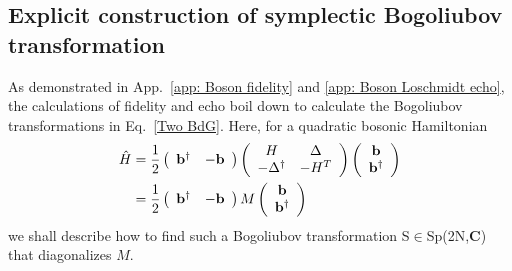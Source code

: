 \subsection{Explicit construction of symplectic Bogoliubov transformation}
\label{app: Explicit construction of symplectic Bogoliubov transformation}
As demonstrated in App.~\ref{app: Boson fidelity} and \ref{app: Boson Loschmidt echo}, the calculations of fidelity and echo boil down to calculate the Bogoliubov transformations in Eq.~\eqref{Two BdG}. Here, for a quadratic bosonic Hamiltonian
\begin{eqnarray}\begin{aligned}
\label{Quadratic boson H2}
\hat{H}&=\frac{1}{2}
\left(\begin{array}{ccc}
{\bf b}^\dagger & -{\bf b}
\end{array}\right)
\left(\begin{array}{ccc}
H & \Delta\\
-\Delta^\dagger & -H^T
\end{array}\right)
\left(\begin{array}{ccc}
{\bf b} \\
{\bf b}^\dagger
\end{array}\right)\\
&=\frac{1}{2}
\left(\begin{array}{ccc}
{\bf b}^\dagger & -{\bf b}
\end{array}\right)
M
\left(\begin{array}{ccc}
{\bf b} \\
{\bf b}^\dagger
\end{array}\right)
\end{aligned}\end{eqnarray}
we shall describe how to find such a Bogoliubov transformation S$\in$Sp(2N,{\bf C}) that diagonalizes $M$. 

